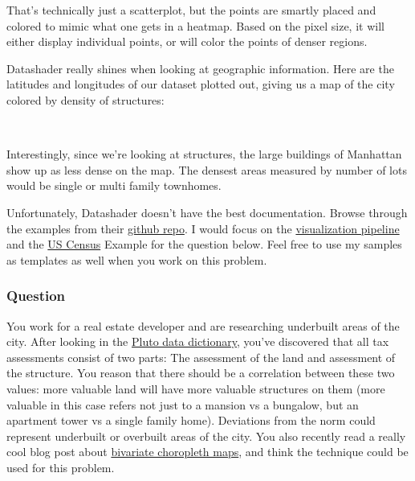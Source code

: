 \documentclass[11pt]{article}
\begin{document}
    That's technically just a scatterplot, but the points are smartly placed
and colored to mimic what one gets in a heatmap. Based on the pixel
size, it will either display individual points, or will color the points
of denser regions.

Datashader really shines when looking at geographic information. Here
are the latitudes and longitudes of our dataset plotted out, giving us a
map of the city colored by density of structures:
 
            
    
    \begin{center}
    \end{center}
    { \hspace*{\fill} \\}
    

    Interestingly, since we're looking at structures, the large buildings of
Manhattan show up as less dense on the map. The densest areas measured
by number of lots would be single or multi family townhomes.

Unfortunately, Datashader doesn't have the best documentation. Browse
through the examples from their
\href{https://github.com/bokeh/datashader/tree/master/examples}{github
repo}. I would focus on the
\href{https://anaconda.org/jbednar/pipeline/notebook}{visualization
pipeline} and the \href{https://anaconda.org/jbednar/census/notebook}{US
Census} Example for the question below. Feel free to use my samples as
templates as well when you work on this problem.

\hypertarget{question}{%
\subsubsection{Question}\label{question}}

You work for a real estate developer and are researching underbuilt
areas of the city. After looking in the
\href{https://www1.nyc.gov/assets/planning/download/pdf/data-maps/open-data/pluto_datadictionary.pdf?v=17v1_1}{Pluto
data dictionary}, you've discovered that all tax assessments consist of
two parts: The assessment of the land and assessment of the structure.
You reason that there should be a correlation between these two values:
more valuable land will have more valuable structures on them (more
valuable in this case refers not just to a mansion vs a bungalow, but an
apartment tower vs a single family home). Deviations from the norm could
represent underbuilt or overbuilt areas of the city. You also recently
read a really cool blog post about
\href{http://www.joshuastevens.net/cartography/make-a-bivariate-choropleth-map/}{bivariate
choropleth maps}, and think the technique could be used for this
problem.
\end{document}
